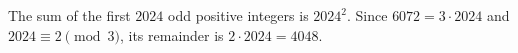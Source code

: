 The sum of the first $2024$ odd positive integers is $2024^2$. Since $6072=3\cdot2024$ and $2024\equiv2\pmod3$, its remainder is $2\cdot2024=\boxed{4048}$.
